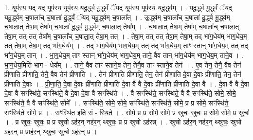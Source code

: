\documentclass[17pt]{extarticle}
\begin{document}
1. यूप॑स्य॒ यद् यद् यूप॑स्य॒ यूप॑स्य॒ यदू॒र्द्ध्व मू॒र्द्ध्वं ॅयद् यूप॑स्य॒ यूप॑स्य॒ यदू॒र्द्ध्वम् । . यदू॒र्द्ध्व मू॒र्द्ध्वं ॅयद् यदू॒र्द्ध्वम् च॒षाला᳚च् च॒षाला॑ दू॒र्द्ध्वं ॅयद् यदू॒र्द्ध्वम् च॒षाला᳚त् । . ऊ॒र्द्ध्वम् च॒षाला᳚च् च॒षाला॑ दू॒र्द्ध्व मू॒र्द्ध्वम् च॒षाला॒त् तेषा॒म् तेषा᳚म् च॒षाला॑ दू॒र्द्ध्व मू॒र्द्ध्वम् च॒षाला॒त् तेषा᳚म् । . च॒षाला॒त् तेषा॒म् तेषा᳚म् च॒षाला᳚च् च॒षाला॒त् तेषा॒म् तत् तत् तेषा᳚म् च॒षाला᳚च् च॒षाला॒त् तेषा॒म् तत् । . तेषा॒म् तत् तत् तेषा॒म् तेषा॒म् तद् भा॑ग॒धेय॑म् भाग॒धेय॒म् तत् तेषा॒म् तेषा॒म् तद् भा॑ग॒धेय᳚म् । . तद् भा॑ग॒धेय॑म् भाग॒धेय॒म् तत् तद् भा॑ग॒धेय॒म् ताꣳ स्तान् भा॑ग॒धेय॒म् तत् तद् भा॑ग॒धेय॒म् तान् । . भा॒ग॒धेय॒म् ताꣳ स्तान् भा॑ग॒धेय॑म् भाग॒धेय॒म् ताने॒ वैव तान् भा॑ग॒धेय॑म् भाग॒धेय॒म् ताने॒व । . भा॒ग॒धेय॒मिति॑ भाग - धेय᳚म् । . ताने॒ वैव ताꣳ स्ताने॒व तेन॒ तेनै॒व ताꣳ स्ताने॒व तेन॑ । . ए॒व तेन॒ तेनै॒ वैव तेन॑ प्रीणाति प्रीणाति॒ तेनै॒ वैव तेन॑ प्रीणाति । . तेन॑ प्रीणाति प्रीणाति॒ तेन॒ तेन॑ प्रीणाति दे॒वा दे॒वाः प्री॑णाति॒ तेन॒ तेन॑ प्रीणाति दे॒वाः । . प्री॒णा॒ति॒ दे॒वा दे॒वाः प्री॑णाति प्रीणाति दे॒वा वै वै दे॒वाः प्री॑णाति प्रीणाति दे॒वा वै । . दे॒वा वै वै दे॒वा दे॒वा वै सꣳस्थि॑ते॒ सꣳस्थि॑ते॒ वै दे॒वा दे॒वा वै सꣳस्थि॑ते । . वै सꣳस्थि॑ते॒ सꣳस्थि॑ते॒ वै वै सꣳस्थि॑ते॒ सोमे॒ सोमे॒ सꣳस्थि॑ते॒ वै वै सꣳस्थि॑ते॒ सोमे᳚ । . सꣳस्थि॑ते॒ सोमे॒ सोमे॒ सꣳस्थि॑ते॒ सꣳस्थि॑ते॒ सोमे॒ प्र प्र सोमे॒ सꣳस्थि॑ते॒ सꣳस्थि॑ते॒ सोमे॒ प्र । . सꣳस्थि॑त॒ इति॒ सं - स्थि॒ते॒ । . सोमे॒ प्र प्र सोमे॒ सोमे॒ प्र स्रुचः॒ स्रुचः॒ प्र सोमे॒ सोमे॒ प्र स्रुचः॑ । . प्र स्रुचः॒ स्रुचः॒ प्र प्र स्रुचो ऽह॑र॒न् नह॑र॒न् थ्स्रुचः॒ प्र प्र स्रुचो ऽह॑रन्न् । . स्रुचो ऽह॑र॒न् नह॑र॒न् थ्स्रुचः॒ स्रुचो ऽह॑र॒न् प्र प्राह॑र॒न् थ्स्रुचः॒ स्रुचो ऽह॑र॒न् प्र । \newline
\end{document}
